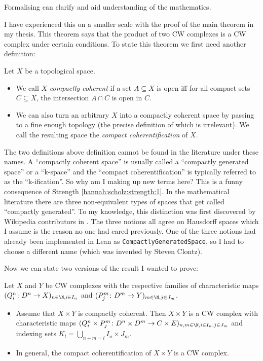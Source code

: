 \begin{strength}
Formalising can clarify and aid understanding of the mathematics.
\end{strength}

I have experienced this on a smaller scale with the proof of the main theorem in my thesis. This theorem says that the product of two CW complexes is a CW complex under certain conditions. To state this theorem we first need another definition: 

\begin{definition}
Let $X$ be a topological space. 
\begin{itemize}[(i)]
    \item We call $X$ \emph{compactly coherent} if a set $A \subseteq X$ is open iff for all compact sets $C \subseteq X$, the intersection $A \cap C$ is open in $C$.
    \item We can also turn an arbitrary $X$ into a compactly coherent space by passing to a fine enough topology (the precise definition of which is irrelevant). We call the resulting space the \emph{compact coherentification} of $X$. 
\end{itemize} 
\end{definition}

The two definitions above definition cannot be found in the literature under these names. A ``compactly coherent space'' is usually called a ``compactly generated space'' or a ``k-space'' and the ``compact coherentification'' is typically referred to as the ``k-ification''. So why am I making up new terms here? This is a funny consequence of Strength \ref{hannah:scholz:strength:1}. In the mathematical literature there are three non-equivalent types of spaces that get called ``compactly generated''. To my knowledge, this distinction was first discovered by Wikipedia contributors in \cite{CompactlyCoherent}. The three notions all agree on Hausdorff spaces which I assume is the reason no one had cared previously. One of the three notions had already been implemented in Lean as \lstinline[language=lean]|CompactlyGeneratedSpace|, so I had to choose a different name (which was invented by Steven Clontz). 

Now we can state two versions of the result I wanted to prove: 

\begin{theorem}
Let $X$ and $Y$ be CW complexes with the respective families of characteristic maps $(Q_i^n \colon D^n \to X)_{n \in \N, i \in I_n}$ and $(P_j^m \colon D^m \to Y)_{m \in \N, j \in J_m}$. 
\begin{itemize}[(i)]
    \item Assume that $X \times Y$ is compactly coherent. Then $X \times Y$ is a CW complex with characteristic maps $(Q_i^n \times P_j^m \colon D^n \times D^m \to C \times E)_{n,m \in \N,i \in I_n,j \in J_m}$ and indexing sets $K_l = \bigcup_{n + m = l}I_n \times J_m$.
    \item In general, the compact coherentification of $X \times Y$ is a CW complex. 
\end{itemize}
\end{theorem}

